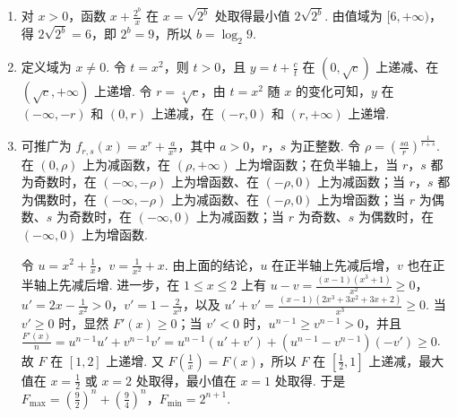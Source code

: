 \begin{solution}
\begin{enumerate}
\item 对 \(x>0\)，函数 \(x+\frac{2^b}{x}\) 在 \(x=\sqrt{2^b}\) 处取得最小值 \(2\sqrt{2^b}\). 由值域为 \([6,+\infty)\)，得 \(2\sqrt{2^b}=6\)，即 \(2^b=9\)，所以 \(b=\log_2 9\).
\item 定义域为 \(x\neq0\). 令 \(t=x^2\)，则 \(t>0\)，且 \(y=t+\frac{c}{t}\) 在 \((0,\sqrt{c})\) 上递减、在 \((\sqrt{c},+\infty)\) 上递增. 令 \(r=\sqrt[4]{c}\)，由 \(t=x^2\) 随 \(x\) 的变化可知，\(y\) 在 \((-\infty,-r)\) 和 \((0,r)\) 上递减，在 \((-r,0)\) 和 \((r,+\infty)\) 上递增.
\item 可推广为
\(f_{r,s}(x)=x^r+\frac{a}{x^s}\)，其中 \(a>0\)，\(r\)，\(s\) 为正整数. 令 \(\rho=\left(\frac{sa}{r}\right)^{\frac{1}{r+s}}\). 在 \((0,\rho)\) 上为减函数，在 \((\rho,+\infty)\) 上为增函数；在负半轴上，当 \(r\)，\(s\) 都为奇数时，在 \((-\infty,-\rho)\) 上为增函数、在 \((-\rho,0)\) 上为减函数；当 \(r\)，\(s\) 都为偶数时，在 \((-\infty,-\rho)\) 上为减函数、在 \((-\rho,0)\) 上为增函数；当 \(r\) 为偶数、\(s\) 为奇数时，在 \((-\infty,0)\) 上为减函数；当 \(r\) 为奇数、\(s\) 为偶数时，在 \((-\infty,0)\) 上为增函数.

令 \(u=x^2+\frac{1}{x}\)，\(v=\frac{1}{x^2}+x\). 由上面的结论，\(u\) 在正半轴上先减后增，\(v\) 也在正半轴上先减后增. 进一步，在 \(1\leq x\leq2\) 上有
\(u-v=\frac{(x-1)(x^3+1)}{x^2}\geq0\)，\(u'=2x-\frac{1}{x^2}>0\)，\(v'=1-\frac{2}{x^3}\)，以及
\(\displaystyle u'+v'=\frac{(x-1)(2x^3+3x^2+3x+2)}{x^3}\geq0\). 当 \(v'\geq0\) 时，显然 \(F'(x)\geq0\)；当 \(v'<0\) 时，\(u^{n-1}\geq v^{n-1}>0\)，并且
\(\displaystyle \frac{F'(x)}{n}=u^{n-1}u'+v^{n-1}v'=u^{n-1}(u'+v')+\left(u^{n-1}-v^{n-1}\right)(-v')\geq0\). 故 \(F\) 在 \([1,2]\) 上递增. 又 \(F(\frac{1}{x})=F(x)\)，所以 \(F\) 在 \(\left[\frac{1}{2},1\right]\) 上递减，最大值在 \(x=\frac{1}{2}\) 或 \(x=2\) 处取得，最小值在 \(x=1\) 处取得. 于是
\(\displaystyle F_{\max}=\left(\frac{9}{2}\right)^n+\left(\frac{9}{4}\right)^n\)，\(F_{\min}=2^{n+1}\).
\end{enumerate}
\end{solution}
